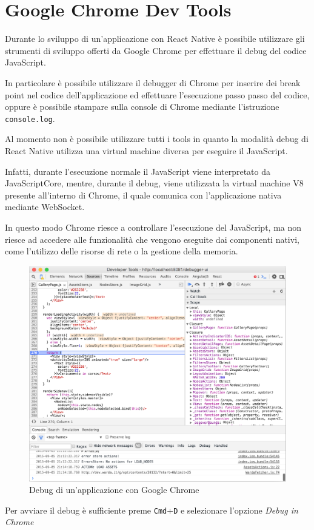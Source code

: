 \section{Google Chrome Dev Tools}\label{sec:chrome}

Durante lo sviluppo di un'applicazione con React Native è possibile utilizzare gli strumenti di sviluppo offerti da Google Chrome per effettuare il debug del codice JavaScript.

In particolare è possibile utilizzare il debugger di Chrome per inserire dei break point nel codice dell'applicazione ed effettuare l'esecuzione passo passo del codice, oppure è possibile stampare sulla console di Chrome mediante l'istruzione \texttt{console.log}.

Al momento non è possibile utilizzare tutti i tools in quanto la modalità debug di React Native utilizza una virtual machine diversa per eseguire il JavaScript.

Infatti, durante l'esecuzione normale il JavaScript viene interpretato da JavaScriptCore, mentre, durante il debug, viene utilizzata la virtual machine V8 presente all'interno di Chrome, il quale comunica con l'applicazione nativa mediante WebSocket.

In questo modo Chrome riesce a controllare l'esecuzione del JavaScript, ma non riesce ad accedere alle funzionalità che vengono eseguite dai componenti nativi, come l'utilizzo delle risorse di rete o la gestione della memoria.

\begin{figure}[htp]
\centering
\includegraphics[width=\textwidth]{../immagini/chrome-tools}
\caption{Debug di un'applicazione con Google Chrome}  
\end{figure}

Per avviare il debug è sufficiente preme \texttt{Cmd}+\texttt{D} e selezionare l'opzione \textit{Debug in Chrome}










